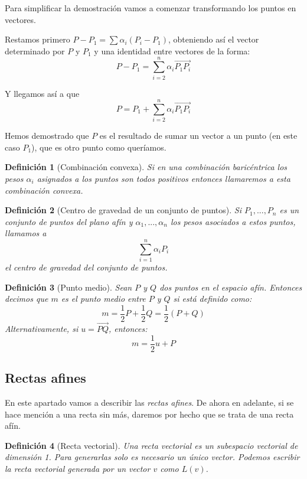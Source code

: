 \documentclass[11pt, a4paper, titlepage]{article}
\makeatletter
\renewenvironment{proof}[1][\proofname] {\vspace{-15pt}\par\pushQED{\qed}\normalfont\topsep6\p@\@plus6\p@\relax\trivlist\item[\hskip\labelsep\it#1\@addpunct{.}]\ignorespaces}{\popQED\endtrivlist\@endpefalse}
\theoremstyle{theorem-style}
\theoremstyle{definition-style}
\newtheorem*{ndef}{Definición}
\theoremstyle{remark-style}
\theoremstyle{example-style}
\makeatother
\begin{document}
\begin{proof}

Para simplificar la demostración vamos a comenzar transformando los puntos en vectores.

	Restamos primero $P-P_1 = \sum \alpha_i(P_i-P_1)$, obteniendo así el vector determinado por $P$ y $P_1$ y una identidad entre vectores de la forma:
	\[
	P-P_1 = \sum_{i=2}^n \alpha_i \overrightarrow{P_1P_i}
	\]

	Y llegamos así a que
	\[
	P = P_1 + \sum_{i=2}^n \alpha_i \overrightarrow{P_1P_i}
	\]
	
	Hemos demostrado que $P$ es el resultado de sumar un vector a un punto (en este caso $P_1$), que es otro punto como queríamos.
\end{proof}

\begin{ndef}[Combinación convexa]
	Si en una combinación baricéntrica los pesos $\alpha_i$ asignados a los puntos son todos positivos entonces llamaremos a esta combinación \textit{convexa}. \end{ndef}

\begin{ndef}[Centro de gravedad de un conjunto de puntos]
	Si $P_1,...,P_n$ es un conjunto de puntos del plano afín y $\alpha_1,...,\alpha_n$ los \textit{pesos} asociados a estos puntos, llamamos a
	\[
	\sum_{i=1}^n \alpha_iP_i
	\]
	el \textit{centro de gravedad del conjunto de puntos}.
\end{ndef}

\begin{ndef}[Punto medio]
Sean $P$ y $Q$ dos puntos en el espacio afín. Entonces decimos que $m$ es el punto medio entre $P$ y $Q$ si está definido como:
\[
m = \dfrac{1}{2} P + \dfrac{1}{2}Q = \dfrac{1}{2}(P+Q)
\]
Alternativamente, si $u = \overrightarrow{PQ}$, entonces:
\[
m = \dfrac{1}{2}u + P
\]

\end{ndef}

\subsection{Rectas afines}

En este apartado vamos a describir las \textit{rectas afines}. De ahora en adelante, si se hace mención a una recta sin más, daremos por hecho que se trata de una recta afín.

\begin{ndef}[Recta vectorial]
	Una recta vectorial es un subespacio vectorial de dimensión 1. Para generarlas solo es necesario un único vector. Podemos escribir la \textit{recta vectorial generada por un vector} $v$ como $L(v)$.
\end{ndef}
\end{document}
